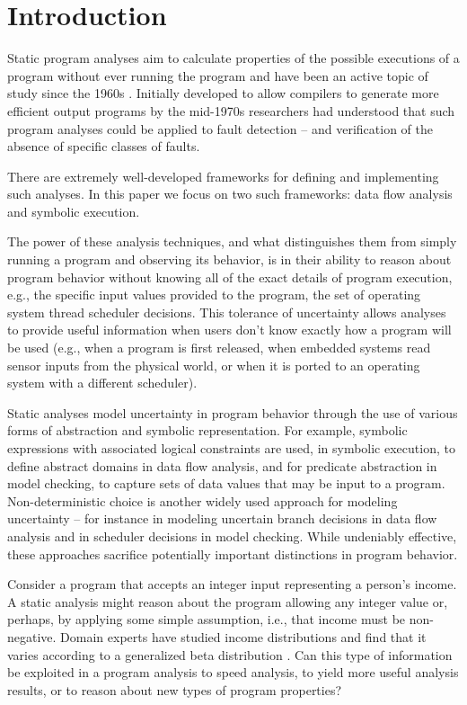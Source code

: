 \section{Introduction}
\label{sec:introduction}

Static program analyses aim to calculate properties of 
the possible executions of a program without ever running the program
and have been an active topic of study since the 1960s \cite{First}.
Initially developed to allow compilers to generate more efficient
output programs by the mid-1970s \cite{Fosdick} researchers had
understood that such program analyses could be applied to fault
detection -- and verification of the absence of specific classes of faults.

There are extremely well-developed frameworks for defining
and implementing such analyses.  In this paper we focus on two
such frameworks: data flow analysis and symbolic execution.

The power of these analysis techniques, and what distinguishes them from
simply running a program and observing its behavior, is in their
ability to reason about program behavior without knowing all of the
exact details of program execution, e.g., the specific 
input values provided to the program, the set of operating system
thread scheduler decisions.  This tolerance of uncertainty allows analyses
to provide useful information when users don't know exactly how
a program will be used (e.g., when a program is first released, when
embedded systems read sensor inputs from the physical world, or
when it is ported to an operating system with a different scheduler).

Static analyses model uncertainty in program behavior
through the use of various forms of abstraction and symbolic representation.
For example, symbolic expressions with associated logical constraints 
are used, in symbolic execution, to define abstract domains
in data flow analysis, and for predicate abstraction in model checking, 
to capture sets of data values that may be input to a program.
Non-deterministic choice is another widely used approach for modeling
uncertainty -- for instance in modeling uncertain branch 
decisions in data flow analysis and
in scheduler decisions in model checking.
While undeniably effective, these approaches sacrifice potentially
important distinctions in program behavior.   

Consider a program that accepts an integer input representing
a person's income.  A static analysis might reason about the program
allowing any integer value or, perhaps, by applying
some simple assumption, i.e., that income must be non-negative.
Domain experts have studied income distributions and find that
it varies according to a generalized beta distribution 
\cite{IncomeDistribution}.  Can this type of information be 
exploited in a program analysis to speed analysis,
to yield more useful analysis results, or to reason 
about new types of program properties?


